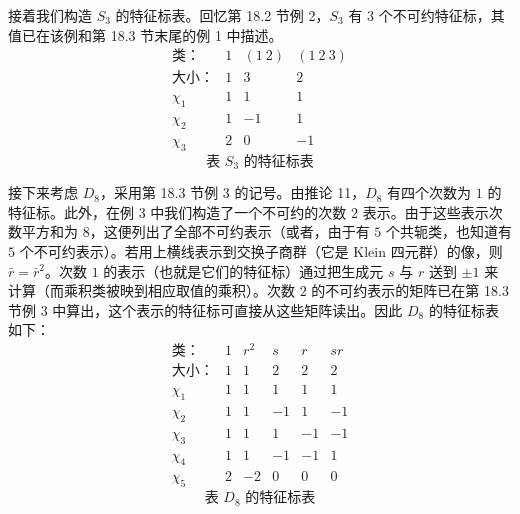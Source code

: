 接着我们构造 $S_3$ 的特征标表。回忆第 18.2 节例 2，$S_3$ 有 $3$ 个不可约特征标，其值已在该例和第 18.3 节末尾的例 1 中描述。
\[
\begin{array}{c|ccc}
\text{类：} & 1 & (1\ 2) & (1\ 2\ 3)\\
\text{大小：} & 1 & 3 & 2\\\hline
\chi_1 & 1 & 1 & 1\\
\chi_2 & 1 & -1 & 1\\
\chi_3 & 2 & 0 & -1
\end{array}
\]
\[
\text{表 }S_3\text{ 的特征标表}
\]

接下来考虑 $D_8$，采用第 18.3 节例 3 的记号。由推论 11，$D_8$ 有四个次数为 $1$ 的特征标。此外，在例 3 中我们构造了一个不可约的次数 $2$ 表示。由于这些表示次数平方和为 $8$，这便列出了全部不可约表示（或者，由于有 $5$ 个共轭类，也知道有 $5$ 个不可约表示）。若用上横线表示到交换子商群（它是 Klein 四元群）的像，则 $\bar r=\bar r^2$。次数 $1$ 的表示（也就是它们的特征标）通过把生成元 $s$ 与 $r$ 送到 $\pm1$ 来计算（而乘积类被映到相应取值的乘积）。次数 $2$ 的不可约表示的矩阵已在第 18.3 节例 3 中算出，这个表示的特征标可直接从这些矩阵读出。因此 $D_8$ 的特征标表如下：
\[
\begin{array}{c|ccccc}
\text{类：} & 1 & r^2 & s & r & sr\\
\text{大小：} & 1 & 1 & 2 & 2 & 2\\\hline
\chi_1 & 1 & 1 & 1 & 1 & 1\\
\chi_2 & 1 & 1 & -1 & 1 & -1\\
\chi_3 & 1 & 1 & 1 & -1 & -1\\
\chi_4 & 1 & 1 & -1 & -1 & 1\\
\chi_5 & 2 & -2 & 0 & 0 & 0
\end{array}
\]
\[
\text{表 }D_8\text{ 的特征标表}
\]

